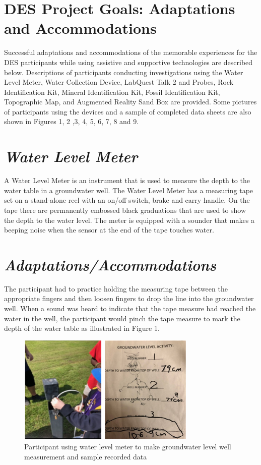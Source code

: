 \documentclass[11pt]{sig-alternate}
\begin{document}
\begin{large}
\section*{DES Project Goals: Adaptations and Accommodations}

Successful adaptations and accommodations of the memorable experiences for the DES participants while using assistive and supportive technologies are described below. Descriptions of participants conducting investigations using the Water Level Meter, Water Collection Device, LabQuest Talk 2 and Probes, Rock Identification Kit, Mineral Identification Kit, Fossil Identification Kit, Topographic Map, and Augmented Reality Sand Box are provided.  Some pictures of participants using the devices and a sample of completed data sheets are also shown in Figures 1, 2 ,3, 4, 5, 6, 7, 8 and 9.

\section*{\textit{Water Level Meter}}

A Water Level Meter is an instrument that is used to measure the depth to the water table in a groundwater well. The Water Level Meter has a measuring tape set on a stand-alone reel with an on/off switch, brake and carry handle. On the tape there are permanently embossed black graduations that are used to show the depth to the water level. The meter is equipped with a sounder that makes a beeping noise when the sensor at the end of the tape touches water.

\section*{\textit{Adaptations/Accommodations}}

The participant had to practice holding the measuring tape between the appropriate fingers and then loosen fingers to drop the line into the groundwater well.  When a sound was heard to indicate that the tape measure had reached the water in the well, the participant would pinch the tape measure to mark the depth of the water table as illustrated in Figure 1.

{\begin{figure}[htp] 
    \leftmargin
    \includegraphics[width=8.5cm]{figure1.png}
    \caption{Participant using water level meter to make  groundwater level well measurement and sample recorded data }
    \label{hands-on Bohr model using Styrofoam}
\end{figure}
}


\end{large}
\end{document}
